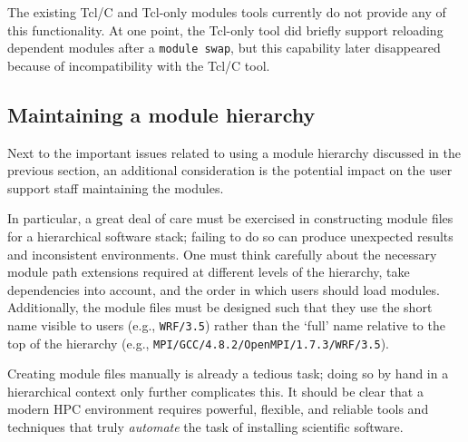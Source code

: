 The existing Tcl/C and Tcl-only modules tools currently do not provide any of this
functionality. At one point, the Tcl-only tool did briefly support reloading
dependent modules after a \texttt{\small module swap}, but this capability later
disappeared because of incompatibility with the Tcl/C tool.




\subsection{Maintaining a module hierarchy}
\label{sec:maintaining_a_hierarchy}

Next to the important issues related to using a module hierarchy discussed in the
previous section, an additional consideration is the potential impact on the user
support staff maintaining the modules.

In particular, a great deal of care must be exercised in constructing module files
for a hierarchical software stack; failing to do so can produce unexpected results
and inconsistent environments. One must think carefully about the necessary module
path extensions required at different levels of the hierarchy, take dependencies into account, and the order in which users should load modules. Additionally, the
module files must be designed such that they use the short name visible to users
(e.g., \texttt{\small WRF/3.5}) rather than the `full' name relative to the top of
the hierarchy (e.g., \texttt{\small MPI/GCC/4.8.2/OpenMPI/1.7.3/WRF/3.5}).

Creating module files manually is already a tedious task; doing so by hand in a
hierarchical context only further complicates this. It should be clear that a modern 
HPC environment requires powerful, flexible, and reliable tools and techniques that
truly \emph{automate} the task of installing scientific software.

